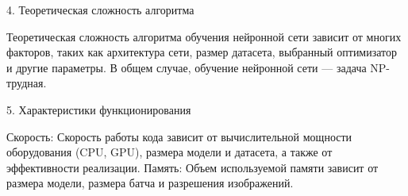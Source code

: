  4. Теоретическая сложность алгоритма

Теоретическая сложность алгоритма  обучения  нейронной  сети  зависит  от  многих  факторов,  таких  как  архитектура  сети,  размер  датасета,  выбранный  оптимизатор  и  другие  параметры.  В  общем  случае,  обучение  нейронной  сети  —  задача  NP-трудная.  

 5. Характеристики  функционирования

Скорость: Скорость  работы  кода  зависит  от  вычислительной  мощности  оборудования  (CPU,  GPU),  размера  модели  и  датасета,  а  также  от  эффективности  реализации. 
Память: Объем  используемой  памяти  зависит  от  размера  модели,  размера  батча  и  разрешения  изображений. 

\newpage
